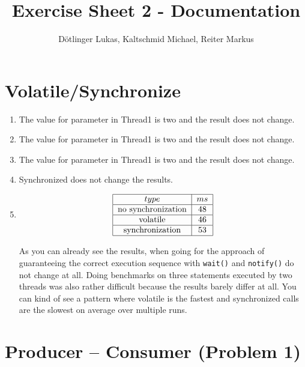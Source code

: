 \documentclass{article}
\begin{document}
	\title{Exercise Sheet 2 - Documentation}
	\date{}
	\author{Dötlinger Lukas, Kaltschmid Michael, Reiter Markus}

	\maketitle

	\section{Volatile/Synchronize}

	\begin{enumerate}[a/]
    \item The value for parameter in Thread1 is two and the result does not change.
    \item The value for parameter in Thread1 is two and the result does not change.
    \item The value for parameter in Thread1 is two and the result does not change.
    \item Synchronized does not change the results.
    \item
    \begin{doublespacing}
      \begin{align*}
        \begin{tabular}{|*{2}{c|}}
          \hline
          $type$ & $ms$ \\
          \hline
          no synchronization & 48 \\
          \hline
          volatile & 46 \\
          \hline
          synchronization & 53 \\
          \hline
        \end{tabular}
      \end{align*}
    \end{doublespacing}

		As you can already see the results, when going for the approach of guaranteeing the correct execution sequence with \texttt{wait()} and \texttt{notify()} do not change at all. Doing benchmarks on three statements executed by two threads was also rather difficult because the results barely differ at all. You can kind of see a pattern where volatile is the fastest and synchronized calls are the slowest on average over multiple runs.
  \end{enumerate}

  \section{Producer – Consumer (Problem 1)}
\end{document}
